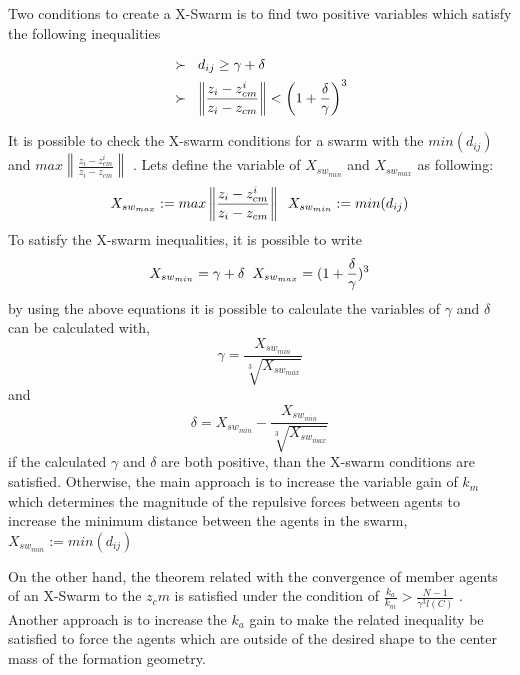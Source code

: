 \documentclass[twoside]{article}
\newcommand{\norm}[1]{\left\lVert#1\right\rVert}
\begin{document}
Two conditions to create a X-Swarm is to find two positive variables which satisfy the following inequalities

		\begin{align*}
		&\succ\hspace{0.2cm}  d_{ij} \geq \gamma + \delta \\
		&\succ \hspace{0.2cm}   \norm{\frac{z_i - z_{cm}^i}{z_i - z_{cm}}} < \left(1+\frac{\delta}{\gamma}\right)^3
		\end{align*}
		
		It is possible to check the X-swarm conditions for a swarm  with the $min(d_{ij})$ and $max \norm{\frac{z_i - z_{cm}^i}{z_i - z_{cm}}} $ . Lets define the variable  of $X_{sw_{min}}$ and $X_{sw_{max}}$ as following:
		\begin{equation}
X_{sw_{max}} := max \norm{\frac{z_i - z_{cm}^i}{z_i - z_{cm}}}  \hspace{0.2cm} X_{sw_{min}} := min(d_{ij})
		\end{equation}
			To satisfy the X-swarm inequalities, it is possible to write 
			\begin{equation}
 X_{sw_{min}} = \gamma + \delta  \hspace{0.2cm} X_{sw_{max}} = (1 + \frac{\delta}{\gamma})^3
			\end{equation}
			by using the above equations it is possible to calculate the variables of $\gamma$ and $\delta$ can be calculated with,
			\begin{equation}
  \gamma = \frac{ X_{sw_{min}}}{\sqrt[3]{ X_{sw_{max}}}}
			\end{equation}
			and
			\begin{equation}
\delta =  X_{sw_{min}} - \frac{ X_{sw_{min}}}{\sqrt[3]{ X_{sw_{max}}}}
			\end{equation}
			if the calculated  $\gamma$ and $\delta$ are both positive, than the X-swarm conditions are satisfied. Otherwise, the main approach is to increase the variable gain of $k_m$ which determines the magnitude of the repulsive forces between agents to increase the minimum distance between the agents in the swarm, $X_{sw_{min}} := min(d_{ij})$
			
			On the other hand, the theorem related with the convergence of member agents of an X-Swarm to the $z_cm$ is satisfied under the condition of $\frac{k_a}{k_m} > \frac{N-1}{\gamma^3  l(C)}$ . Another approach is to increase the $k_a$ gain to make the related inequality be satisfied to force the agents which are outside of the desired shape to the center mass of the formation geometry. 
			
\end{document}
